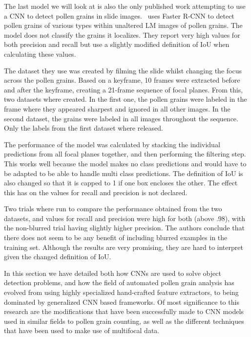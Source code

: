 The last model we will look at is also the only published work attempting to use a CNN to detect pollen grains in slide images.\ \textcite{gallardo_caballero_precise_2019} uses Faster R-CNN to detect pollen grains of various types within unaltered LM images of pollen grains.
The model does not classify the grains it localizes.
They report very high values for both precision and recall but use a slightly modified definition of IoU when calculating these values.

The dataset they use was created by filming the slide whilst changing the focus across the pollen grains.
Based on a keyframe, 10 frames were extracted before and after the keyframe, creating a 21-frame sequence of focal planes.
From this, two datasets where created.
In the first one, the pollen grains were labeled in the frame where they appeared sharpest and ignored in all other images.
In the second dataset, the grains were labeled in all images throughout the sequence.
Only the labels from the first dataset where released.

The performance of the model was calculated by stacking the individual predictions from all focal planes together, and then performing the filtering step.
This works well because the model makes no class predictions and would have to be adapted to be able to handle multi class predictions.
The definition of IoU is also changed so that it is capped to 1 if one box encloses the other.
The effect this has on the values for recall and precision is not declared.

Two trials where run to compare the performance obtained from the two datasets, and values for recall and precision were high for both (above .98), with the non-blurred trial having slightly higher precision.
The authors conclude that there does not seem to be any benefit of including blurred examples in the training set.
Although the results are very promising, they are hard to interpret given the changed definition of IoU.

In this section we have detailed both how CNNs are used to solve object detection problems, and how the field of automated pollen grain analysis has evolved from using highly specialized hand-crafted feature extractors, to being dominated by generalized CNN based frameworks.
Of most significance to this research are the modifications that have been successfully made to CNN models used in similar fields to pollen grain counting, as well as the different techniques that have been used to make use of multifocal data.

